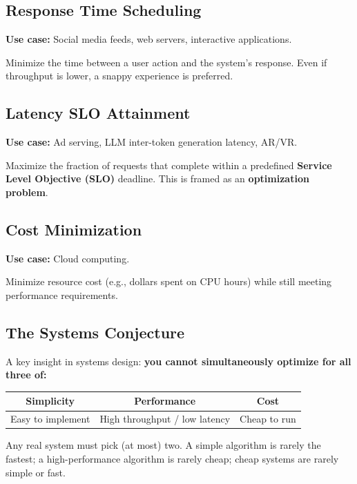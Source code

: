 \documentclass[11pt]{article}
\begin{document}
\subsection{Response Time Scheduling}

\textbf{Use case:} Social media feeds, web servers, interactive applications.

Minimize the time between a user action and the system's response. Even if throughput is lower, a snappy experience is preferred.

\subsection{Latency SLO Attainment}

\textbf{Use case:} Ad serving, LLM inter-token generation latency, AR/VR.

Maximize the fraction of requests that complete within a predefined \textbf{Service Level Objective (SLO)} deadline. This is framed as an \textbf{optimization problem}.

\subsection{Cost Minimization}

\textbf{Use case:} Cloud computing.

Minimize resource cost (e.g., dollars spent on CPU hours) while still meeting performance requirements.

\subsection{The Systems Conjecture}

A key insight in systems design: \textbf{you cannot simultaneously optimize for all three of:}

\begin{center}
\begin{tabular}{ccc}
\toprule
\textbf{Simplicity} & \textbf{Performance} & \textbf{Cost} \\
\midrule
Easy to implement & High throughput / low latency & Cheap to run \\
\bottomrule
\end{tabular}
\end{center}

Any real system must pick (at most) two. A simple algorithm is rarely the fastest; a high-performance algorithm is rarely cheap; cheap systems are rarely simple or fast.
\end{document}
